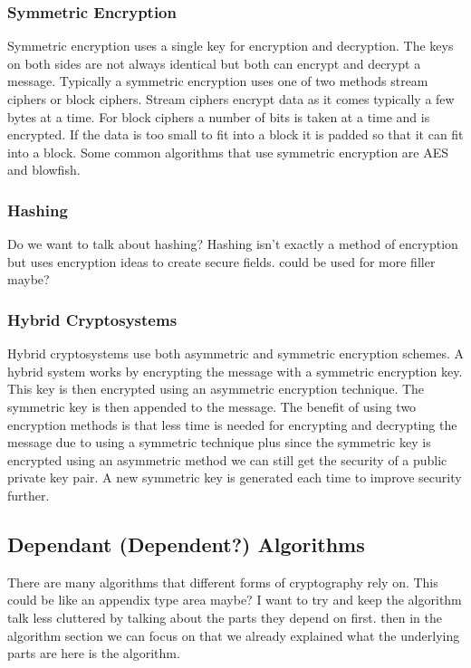 \documentclass[conference]{IEEEtran}
\begin{document}
\subsubsection{Symmetric Encryption}
Symmetric encryption uses a single key for encryption and decryption. The keys on both sides are not always identical but both can encrypt and decrypt a message. Typically a symmetric encryption uses one of two methods stream ciphers or block ciphers. Stream ciphers encrypt data as it comes typically a few bytes at a time. For block ciphers a number of bits is taken at a time and is encrypted. If the data is too small to fit into a block it is padded so that it can fit into a block. Some common algorithms that use symmetric encryption are AES and blowfish.

\subsubsection{Hashing} \color{red}
Do we want to talk about hashing? Hashing isn't exactly a method of encryption but uses encryption ideas to create secure fields. could be used for more filler maybe?
\color{black}
\subsubsection{Hybrid Cryptosystems}
Hybrid cryptosystems use both asymmetric and symmetric encryption schemes. A hybrid system works by encrypting the message with a symmetric encryption key. This key is then encrypted using an asymmetric encryption technique. The symmetric key is then appended to the message. The benefit of using two encryption methods is that less time is needed for encrypting and decrypting the message due to using a symmetric technique plus since the symmetric key is encrypted using an asymmetric method we can still get the security of a public private key pair. A new symmetric key is generated each time to improve security further. 

\color{red}
\subsection{Dependant (Dependent?) Algorithms}
There are many algorithms that different forms of cryptography rely on.
This could be like an appendix type area maybe?
I want to try and keep the algorithm talk less cluttered by talking about the parts they depend on first.
then in the algorithm section we can focus on that we already explained what the underlying parts are here is the algorithm.
\end{document}
